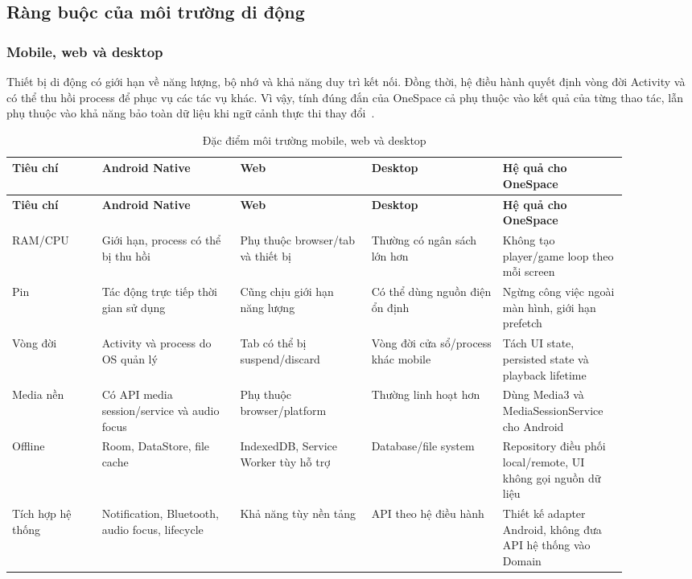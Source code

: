 \subsection{Ràng buộc của môi trường di động}
\label{sec:mobile-constraints}

\subsubsection{Mobile, web và desktop}
\label{sec:mobile-vs-desktop}

Thiết bị di động có giới hạn về năng lượng, bộ nhớ và khả năng duy trì kết nối. Đồng thời, hệ điều hành quyết định vòng đời Activity và có thể thu hồi process để phục vụ các tác vụ khác. Vì vậy, tính đúng đắn của OneSpace cả phụ thuộc vào kết quả của từng thao tác, lẫn phụ thuộc vào khả năng bảo toàn dữ liệu khi ngữ cảnh thực thi thay đổi~\cite{android-lifecycle,android-state}.

\begingroup
\small
\renewcommand{\arraystretch}{1.2}
\setlength{\tabcolsep}{3pt}
\begin{longtable}{>{\RaggedRight\arraybackslash}p{0.13\linewidth}>{\RaggedRight\arraybackslash}p{0.2\linewidth}>{\RaggedRight\arraybackslash}p{0.19\linewidth}>{\RaggedRight\arraybackslash}p{0.19\linewidth}>{\RaggedRight\arraybackslash}p{0.18\linewidth}}
\caption{Đặc điểm môi trường mobile, web và desktop}
\label{tab:mobile-desktop}\\
\toprule
\textbf{Tiêu chí} & \textbf{Android Native} & \textbf{Web} & \textbf{Desktop} & \textbf{Hệ quả cho OneSpace} \\
\midrule
\endfirsthead
\toprule
\textbf{Tiêu chí} & \textbf{Android Native} & \textbf{Web} & \textbf{Desktop} & \textbf{Hệ quả cho OneSpace} \\
\midrule
\endhead
\bottomrule
\endfoot
RAM/CPU & Giới hạn, process có thể bị thu hồi & Phụ thuộc browser/tab và thiết bị & Thường có ngân sách lớn hơn & Không tạo player/game loop theo mỗi screen \\
Pin & Tác động trực tiếp thời gian sử dụng & Cũng chịu giới hạn năng lượng & Có thể dùng nguồn điện ổn định & Ngừng công việc ngoài màn hình, giới hạn prefetch \\
Vòng đời & Activity và process do OS quản lý & Tab có thể bị suspend/discard & Vòng đời cửa sổ/process khác mobile & Tách UI state, persisted state và playback lifetime \\
Media nền & Có API media session/service và audio focus & Phụ thuộc browser/platform & Thường linh hoạt hơn & Dùng Media3 và MediaSessionService cho Android \\
Offline & Room, DataStore, file cache & IndexedDB, Service Worker tùy hỗ trợ & Database/file system & Repository điều phối local/remote, UI không gọi nguồn dữ liệu \\
Tích hợp hệ thống & Notification, Bluetooth, audio focus, lifecycle & Khả năng tùy nền tảng & API theo hệ điều hành & Thiết kế adapter Android, không đưa API hệ thống vào Domain \\
\end{longtable}
\endgroup

